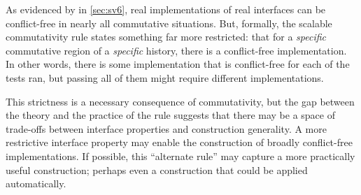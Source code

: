 As evidenced by \sys in \cref{sec:sv6}, real implementations of real
interfaces can be conflict-free in nearly all commutative situations.
But, formally, the scalable commutativity rule states something far
more restricted: that for a \emph{specific} commutative region of a
\emph{specific} history, there is a conflict-free implementation.  In
other words, there is some implementation that is conflict-free for
each of the  tests \tool ran, but passing all
of them might require  different
implementations.

This strictness is a necessary consequence of \SIM commutativity, but
the gap between the theory and the practice of the rule suggests that
there may be a space of trade-offs between interface properties and
construction generality.
%
A more restrictive interface property may enable the construction of
broadly conflict-free implementations.
%
If possible, this ``alternate rule'' may capture a more practically
useful construction; perhaps even a construction that could be applied
automatically.

%
%
%
%

